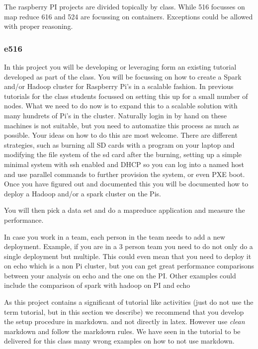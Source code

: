 The raspberry PI projects are divided topically by class. While 516
focusses on map reduce 616 and 524 are focussing on containers.
Exceptions could be allowed with proper reasoning.
 
\subsubsection{e516}
\label{s:idea-project-pi-spark}

In this project you will be developing or leveraging form an existing
tutorial developed as part of the class. You will be focussing on how
to create a Spark and/or Hadoop cluster for Raspberry Pi's in a
scalable fashion. In previous tutorials for the class students
focussed on setting this up for a small number of nodes. What we need
to do now is to expand this to a scalable solution with many hundrets
of Pi's in the cluster. Naturally login in by hand on these machines
is not suitable, but you need to automatize this process as much as
possible. Your ideas on how to do this are most welcome. There are
different strategies, such as burning all SD cards with a program on
your laptop and modifying the file system of the sd card after the
burning, setting up a simple minimal system with ssh enabled and DHCP
so you can log into a named host and use parallel commands to further
provision the system, or even PXE boot. Once you have figured out and
documented this you will be documented how to deploy a Hadoop and/or
a spark cluster on the Pis.

You will then pick a data set and do a mapreduce application and
measure the performance.

In case you work in a team, each person in the team needs to add a new
deployment. Example, if you are in a 3 person team you need to do not
only do a single deployment but multiple. This could even mean that
you need to deploy it on echo which is a non Pi cluster, but you can
get great performance comparisons between your analysis on echo and
the one on the PI. Other examples could include the comparison of
spark with hadoop on PI and echo

As this project contains a significant of tutorial like activities
(just do not use the term tutorial, but in this section we describe)
we recommend that you develop the setup procedure in markdown. and not
directly in latex. However use \emph{clean} markdown and follow the
markdown rules. We have seen in the tutorial to be delivered for this
class many wrong examples on how to not use markdown.

